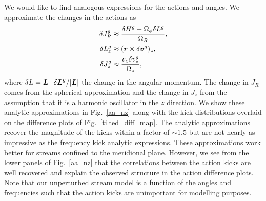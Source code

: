 \documentclass[useAMS,usenatbib,fleqn,a4paper]{mn2e}
\newcommand{\bs}[1]{\bmath{#1}}
\begin{document}
We would like to find analogous expressions for the actions and angles. We approximate the changes in the actions as
\begin{equation}
\begin{split}
\delta J^g_R &\approx \frac{\delta H^g - \Omega_\phi\delta L^g}{\Omega_R},\\
\delta L^g_z &\approx (\bs{r}\times\delta\bs{v}^g)_z,\\
\delta J^g_z &\approx \frac{v_z \delta v^g_z}{\Omega_z},
\end{split}
\label{dJ_an}
\end{equation}
where $\delta L = \bs{L}\cdot\delta\bs{L}^g/|\bs{L}|$ the change in the angular momentum. The change in $J_R$ comes from the spherical approximation and the change in $J_z$ from the assumption that it is a harmonic oscillator in the $z$ direction. We show these analytic approximations in Fig.~\ref{aa_nz} along with the kick distributions overlaid on the difference plots of Fig.~\ref{tilted_diff_map}. The analytic approximations recover the magnitude of the kicks within a factor of $\sim1.5$ but are not nearly as impressive as the frequency kick analytic expressions. These approximations work better for streams confined to the meridional plane. However, we see from the lower panels of Fig.~\ref{aa_nz} that the correlations between the action kicks are well recovered and explain the observed structure in the action difference plots. Note that our unperturbed stream model is a function of the angles and frequencies such that the action kicks are unimportant for modelling purposes.
\end{document}
